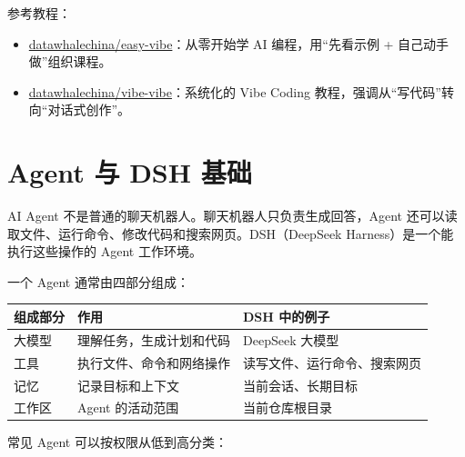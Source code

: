 参考教程：

\begin{itemize}
\tightlist
\item
  \href{https://github.com/datawhalechina/easy-vibe}{datawhalechina/easy-vibe}：从零开始学
  AI 编程，用``先看示例 + 自己动手做''组织课程。
\item
  \href{https://github.com/datawhalechina/vibe-vibe}{datawhalechina/vibe-vibe}：系统化的
  Vibe Coding 教程，强调从``写代码''转向``对话式创作''。
\end{itemize}

\section{Agent 与 DSH 基础}\label{agent-ux4e0e-dsh-ux57faux7840}

AI Agent 不是普通的聊天机器人。聊天机器人只负责生成回答，Agent
还可以读取文件、运行命令、修改代码和搜索网页。DSH（DeepSeek
Harness）是一个能执行这些操作的 Agent 工作环境。

一个 Agent 通常由四部分组成：

\begin{longtable}[]{@{}lll@{}}
\toprule\noalign{}
组成部分 & 作用 & DSH 中的例子 \\
\midrule\noalign{}
\endhead
\bottomrule\noalign{}
\endlastfoot
大模型 & 理解任务，生成计划和代码 & DeepSeek 大模型 \\
工具 & 执行文件、命令和网络操作 & 读写文件、运行命令、搜索网页 \\
记忆 & 记录目标和上下文 & 当前会话、长期目标 \\
工作区 & Agent 的活动范围 & 当前仓库根目录 \\
\end{longtable}

常见 Agent 可以按权限从低到高分类：

